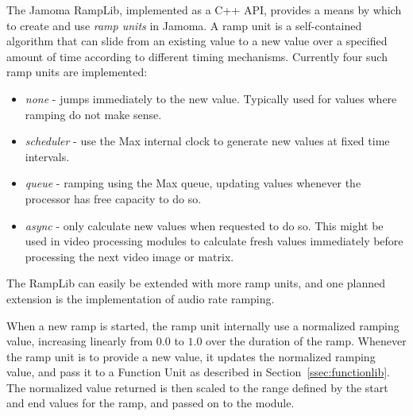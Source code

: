 \documentclass{article}
\begin{document}



The Jamoma RampLib, implemented as a C++ API, provides a means by which to create and use \emph{ramp units} in Jamoma.  A ramp unit is a self-contained algorithm that can slide from an existing value to a new value over a specified amount of time according to different timing mechanisms. Currently four such ramp units are implemented:

\begin{itemize}
	\item \emph{none} - jumps immediately to the new value. Typically used for values where ramping do not make sense.
	\item \emph{scheduler} - use the Max internal clock to generate new values at fixed time intervals.
	\item \emph{queue} - ramping using the Max queue, updating values whenever the processor has free capacity to do so.
	\item \emph{async} - only calculate new values when requested to do so. This might be used in video processing modules to calculate fresh values immediately before processing the next video image or matrix.
\end{itemize}

The RampLib can easily be extended with more ramp units, and one planned extension is the implementation of audio rate ramping.

When a new ramp is started, the ramp unit internally use a normalized ramping value, increasing linearly from $0.0$ to $1.0$ over the duration of the ramp. Whenever the ramp unit is to provide a new value, it updates the normalized ramping value, and pass it to a Function Unit as described in Section~\ref{ssec:functionlib}. The normalized value returned is then scaled to the range defined by the start and end values for the ramp, and passed on to the module.
\end{document}
